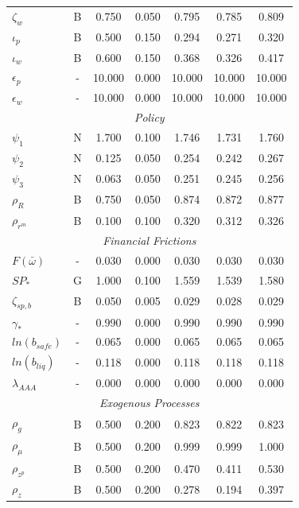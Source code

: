 \documentclass[12pt]{article}
\begin{document}
{\begin{longtable}{lcccccc}
$\zeta_w$ & B &    0.750 &    0.050 &    0.795 &    0.785 &    0.809 \\
$\iota_p$ & B &    0.500 &    0.150 &    0.294 &    0.271 &    0.320 \\
$\iota_w$ & B &    0.600 &    0.150 &    0.368 &    0.326 &    0.417 \\
$\epsilon_{p}$ & - &   10.000 &    0.000 &   10.000 &   10.000 &   10.000 \\
$\epsilon_{w}$ & - &   10.000 &    0.000 &   10.000 &   10.000 &   10.000 \\
\multicolumn{7}{c}{\textit{Policy}} \\[3pt]
$\psi_1$ & N &    1.700 &    0.100 &    1.746 &    1.731 &    1.760 \\
$\psi_2$ & N &    0.125 &    0.050 &    0.254 &    0.242 &    0.267 \\
$\psi_3$ & N &    0.063 &    0.050 &    0.251 &    0.245 &    0.256 \\
$\rho_R$ & B &    0.750 &    0.050 &    0.874 &    0.872 &    0.877 \\
$\rho_{r^m}$ & B &    0.100 &    0.100 &    0.320 &    0.312 &    0.326 \\
\multicolumn{7}{c}{\textit{Financial Frictions}} \\[3pt]
$F(\bar{\omega})$ & - &    0.030 &    0.000 &    0.030 &    0.030 &    0.030 \\
$SP_*$ & G &    1.000 &    0.100 &    1.559 &    1.539 &    1.580 \\
$\zeta_{sp,b}$ & B &    0.050 &    0.005 &    0.029 &    0.028 &    0.029 \\
$\gamma_*$ & - &    0.990 &    0.000 &    0.990 &    0.990 &    0.990 \\
$ln(b_{safe})$ & - &    0.065 &    0.000 &    0.065 &    0.065 &    0.065 \\
$ln(b_{liq})$ & - &    0.118 &    0.000 &    0.118 &    0.118 &    0.118 \\
$\lambda_{AAA}$ & - &    0.000 &    0.000 &    0.000 &    0.000 &    0.000 \\
\multicolumn{7}{c}{\textit{Exogenous Processes}} \\[3pt]
$\rho_g$ & B &    0.500 &    0.200 &    0.823 &    0.822 &    0.823 \\
$\rho_{\mu}$ & B &    0.500 &    0.200 &    0.999 &    0.999 &    1.000 \\
$\rho_{z^p}$ & B &    0.500 &    0.200 &    0.470 &    0.411 &    0.530 \\
$\rho_z$ & B &    0.500 &    0.200 &    0.278 &    0.194 &    0.397 \\

\end{longtable}}
\end{document}
